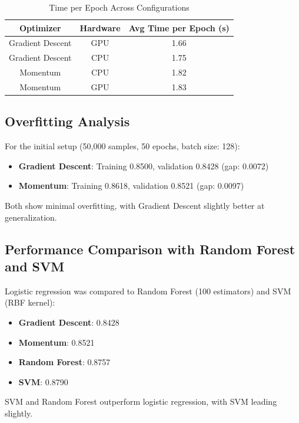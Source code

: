 \documentclass{article}
\begin{document}
\begin{table}[H]
    \centering
    \begin{tabular}{|c|c|c|}
        \hline
        \textbf{Optimizer} & \textbf{Hardware} & \textbf{Avg Time per Epoch (s)} \\ \hline
        Gradient Descent & GPU & 1.66 \\ \hline
        Gradient Descent & CPU & 1.75 \\ \hline
        Momentum & CPU & 1.82 \\ \hline
        Momentum & GPU & 1.83 \\ \hline
    \end{tabular}
    \caption{Time per Epoch Across Configurations}
    \label{tab:performance_comparison}
\end{table}

\subsection{Overfitting Analysis}

For the initial setup (50,000 samples, 50 epochs, batch size: 128):
\begin{itemize}
    \item \textbf{Gradient Descent}: Training 0.8500, validation 0.8428 (gap: 0.0072)
    \item \textbf{Momentum}: Training 0.8618, validation 0.8521 (gap: 0.0097)
\end{itemize}

Both show minimal overfitting, with Gradient Descent slightly better at generalization.

\subsection{Performance Comparison with Random Forest and SVM}

Logistic regression was compared to Random Forest (100 estimators) and SVM (RBF kernel):
\begin{itemize}
    \item \textbf{Gradient Descent}: 0.8428
    \item \textbf{Momentum}: 0.8521
    \item \textbf{Random Forest}: 0.8757
    \item \textbf{SVM}: 0.8790
\end{itemize}

SVM and Random Forest outperform logistic regression, with SVM leading slightly.
\end{document}

